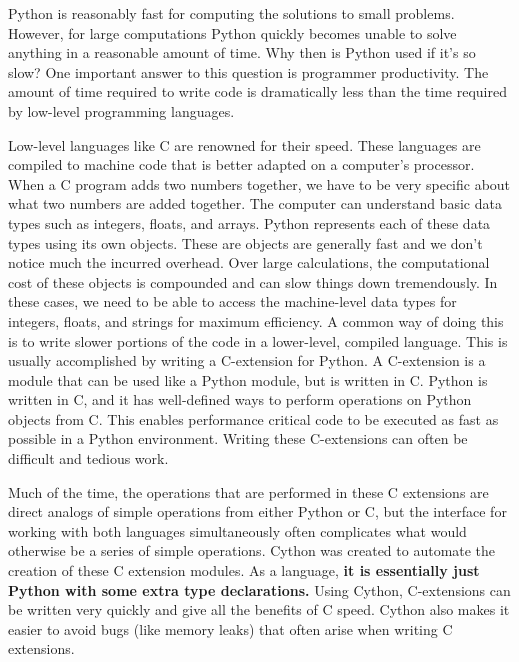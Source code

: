 \label{lab:Cython}

Python is reasonably fast for computing the solutions to small problems.
However, for large computations Python quickly becomes unable to solve anything in a reasonable amount of time.
Why then is Python used if it's so slow?  One important answer to this question is programmer productivity.
The amount of time required to write code is dramatically less than the time required by low-level programming languages.

Low-level languages like C are renowned for their speed.
These languages are compiled to machine code that is better adapted on a computer's processor.
When a C program adds two numbers together, we have to be very specific about what two numbers are added together.
The computer can understand basic data types such as integers, floats, and arrays.
Python represents each of these data types using its own objects.
These are objects are generally fast and we don't notice much the incurred overhead.
Over large calculations, the computational cost of these objects is compounded and can slow things down tremendously.
In these cases, we need to be able to access the machine-level data types for integers, floats, and strings for maximum efficiency.
A common way of doing this is to write slower portions of the code in a lower-level, compiled language.
This is usually accomplished by writing a C-extension for Python.
A C-extension is a module that can be used like a Python module, but is written in C.
Python is written in C, and it has well-defined ways to perform operations on Python objects from C.
This enables performance critical code to be executed as fast as possible in a Python environment.
Writing these C-extensions can often be difficult and tedious work.

Much of the time, the operations that are performed in these C extensions are direct analogs of simple operations from either Python or C, but the interface for working with both languages simultaneously often complicates what would otherwise be a series of simple operations.
Cython was created to automate the creation of these C extension modules.
As a language, \textbf{it is essentially just Python with some extra type declarations.}
Using Cython, C-extensions can be written very quickly and give all the benefits of C speed.
Cython also makes it easier to avoid bugs (like memory leaks) that often arise when writing C extensions.

